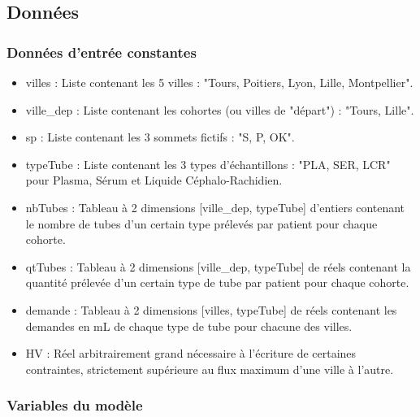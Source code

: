 \documentclass{polytech/polytech}
\numberwithin{figure}{chapter}
\begin{document}
\subsection{Données}

\subsubsection{Données d'entrée constantes}

\begin{itemize}
	\item villes : Liste contenant les 5 villes : "Tours, Poitiers, Lyon, Lille, Montpellier".
	\item ville\_dep : Liste contenant les cohortes (ou villes de "départ") : "Tours, Lille".
	\item sp : Liste contenant les 3 sommets fictifs : "S, P, OK".
	\item typeTube : Liste contenant les 3 types d'échantillons : "PLA, SER, LCR" pour Plasma, Sérum et Liquide Céphalo-Rachidien.
	\item nbTubes : Tableau à 2 dimensions [ville\_dep, typeTube] d'entiers contenant le nombre de tubes d'un certain type prélevés par patient pour chaque cohorte.
	\item qtTubes : Tableau à 2 dimensions [ville\_dep, typeTube] de réels contenant la quantité prélevée d'un certain type de tube par patient pour chaque cohorte.
	\item demande : Tableau à 2 dimensions [villes, typeTube] de réels contenant les demandes en mL de chaque type de tube pour chacune des villes.
	\item HV : Réel arbitrairement grand nécessaire à l'écriture de certaines contraintes, strictement supérieure au flux maximum d'une ville à l'autre.
\end{itemize}

\subsubsection{Variables du modèle}
\end{document}
